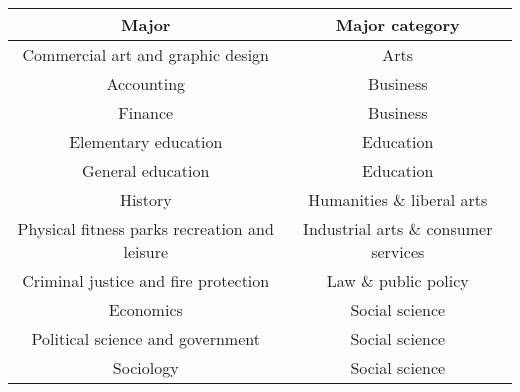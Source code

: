 \documentclass[11pt]{article}
\begin{document}
\begin{center}
    \begin{tabular} {|| c c ||}
    \hline
    Major & Major category \\ [0.5ex]
    \hline\hline

    Commercial art and graphic design & Arts \\
    \hline
    Accounting & Business \\
    \hline
    Finance & Business \\
    \hline
    Elementary education & Education \\
    \hline
    General education & Education \\
    \hline
    History & Humanities \& liberal arts \\
    \hline
    Physical fitness parks recreation and leisure & Industrial arts \& consumer services \\
    \hline
    Criminal justice and fire protection & Law \& public policy \\
    \hline
    Economics & Social science \\
    \hline
    Political science and government & Social science \\
    \hline
    Sociology & Social science \\
    \hline
    \end {tabular}
\end{center}
\end{document}
